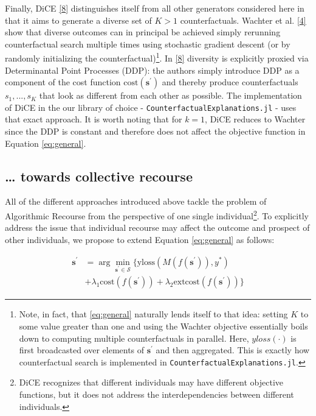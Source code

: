 \documentclass[conference,final,]{IEEEtran}
\theoremstyle{definition}
\theoremstyle{definition}
\theoremstyle{definition}
\theoremstyle{definition}
\theoremstyle{remark}
\begin{document}
Finally, DiCE \protect\hyperlink{ref-mothilal2020explaining}{{[}8{]}} distinguishes itself from all other generators considered here in that it aims to generate a diverse set of \(K>1\) counterfactuals. Wachter et al. \protect\hyperlink{ref-wachter2017counterfactual}{{[}4{]}} show that diverse outcomes can in principal be achieved simply rerunning counterfactual search multiple times using stochastic gradient descent (or by randomly initializing the counterfactual)\footnote{Note, in fact, that \eqref{eq:general} naturally lends itself to that idea: setting \(K\) to some value greater than one and using the Wachter objective essentially boils down to computing multiple counterfactuals in parallel. Here, \(yloss(\cdot)\) is first broadcasted over elements of \(\mathbf{s}^\prime\) and then aggregated. This is exactly how counterfactual search is implemented in \texttt{CounterfactualExplanations.jl}.}. In \protect\hyperlink{ref-mothilal2020explaining}{{[}8{]}} diversity is explicitly proxied via Determinantal Point Processes (DDP): the authors simply introduce DDP as a component of the cost function \(\text{cost}(\mathbf{s}^\prime)\) and thereby produce counterfactuals \(s_1, ... , s_K\) that look as different from each other as possible. The implementation of DiCE in the our library of choice - \texttt{CounterfactualExplanations.jl} - uses that exact approach. It is worth noting that for \(k=1\), DiCE reduces to Wachter since the DDP is constant and therefore does not affect the objective function in Equation \eqref{eq:general}.

\hypertarget{towards-collective-recourse}{%
\subsection{\ldots{} towards collective recourse}\label{towards-collective-recourse}}

All of the different approaches introduced above tackle the problem of Algorithmic Recourse from the perspective of one single individual\footnote{DiCE recognizes that different individuals may have different objective functions, but it does not address the interdependencies between different individuals.}. To explicitly address the issue that individual recourse may affect the outcome and prospect of other individuals, we propose to extend Equation \eqref{eq:general} as follows:

\begin{equation}
\begin{aligned}
\mathbf{s}^\prime &= \arg \min_{\mathbf{s}^\prime \in \mathcal{S}} \{ {\text{yloss}(M(f(\mathbf{s}^\prime)),y^*)} \\ &+ \lambda_1 {\text{cost}(f(\mathbf{s}^\prime))} + \lambda_2 {\text{extcost}(f(\mathbf{s}^\prime))} \}  \label{eq:collective}
\end{aligned} 
\end{equation}
\end{document}

